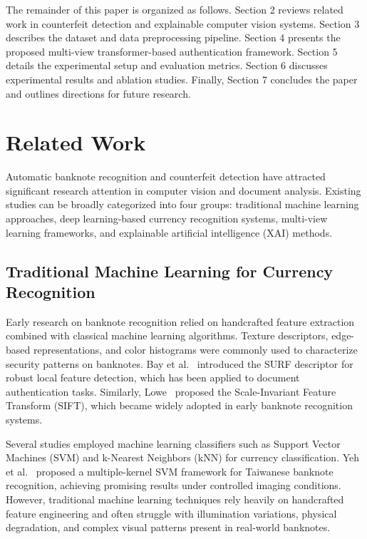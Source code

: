 \documentclass[preprint,12pt,authoryear]{elsarticle}
\begin{document}
The remainder of this paper is organized as follows. Section 2 reviews related work in counterfeit detection and explainable computer vision systems. Section 3 describes the dataset and data preprocessing pipeline. Section 4 presents the proposed multi-view transformer-based authentication framework. Section 5 details the experimental setup and evaluation metrics. Section 6 discusses experimental results and ablation studies. Finally, Section 7 concludes the paper and outlines directions for future research.


\section{Related Work}

Automatic banknote recognition and counterfeit detection have attracted significant research attention in computer vision and document analysis. Existing studies can be broadly categorized into four groups: traditional machine learning approaches, deep learning-based currency recognition systems, multi-view learning frameworks, and explainable artificial intelligence (XAI) methods.

\subsection{Traditional Machine Learning for Currency Recognition}

Early research on banknote recognition relied on handcrafted feature extraction combined with classical machine learning algorithms. Texture descriptors, edge-based representations, and color histograms were commonly used to characterize security patterns on banknotes. Bay et al.~\cite{bay2006surf} introduced the SURF descriptor for robust local feature detection, which has been applied to document authentication tasks. Similarly, Lowe~\cite{lowe2004distinctive} proposed the Scale-Invariant Feature Transform (SIFT), which became widely adopted in early banknote recognition systems.

Several studies employed machine learning classifiers such as Support Vector Machines (SVM) and k-Nearest Neighbors (kNN) for currency classification. Yeh et al.~\cite{yeh2011multiple} proposed a multiple-kernel SVM framework for Taiwanese banknote recognition, achieving promising results under controlled imaging conditions. However, traditional machine learning techniques rely heavily on handcrafted feature engineering and often struggle with illumination variations, physical degradation, and complex visual patterns present in real-world banknotes.
\end{document}
